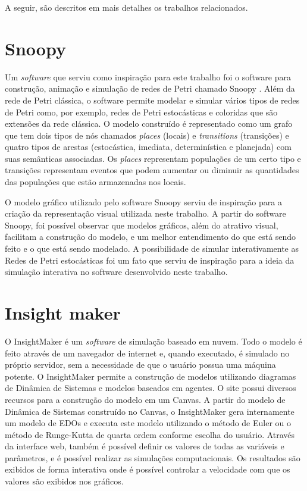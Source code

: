 \documentclass[
	12pt,				%
	openright,			%
	oneside,			%
	a4paper,			%
	main=brazil,
	english,			%
	]{ufsj-abntex2}
\begin{document}
A seguir, são descritos em mais detalhes os trabalhos relacionados. 

\section{Snoopy}

Um \textit{software} que serviu como inspiração para este trabalho foi o software para construção, animação e simulação de redes de Petri chamado Snoopy \cite{Heiner2008,Heiner2012,Liu2012}. Além da rede de Petri clássica, o software permite modelar e simular vários tipos de redes de Petri como, por exemplo, redes de Petri estocásticas e coloridas que são extensões da rede clássica. O modelo construído é representado como um grafo que tem dois tipos de nós chamados \textit{places} (locais) e \textit{transitions} (transições) e quatro tipos de arestas (estocástica, imediata, determinística e planejada) com suas semânticas associadas. Os \textit{places} representam populações de um certo tipo e transições representam eventos que podem aumentar ou diminuir as quantidades das populações que estão armazenadas nos locais. 

O modelo gráfico utilizado pelo software Snoopy serviu de inspiração para a criação da representação visual utilizada neste trabalho. A partir do software Snoopy, foi possível observar que modelos gráficos, além do atrativo visual, facilitam a construção do modelo, e um melhor entendimento do que está sendo feito e o que está sendo modelado. A possibilidade de simular interativamente as Redes de Petri estocásticas foi um fato que serviu de inspiração para a ideia da simulação interativa no software desenvolvido neste trabalho. 

\section{Insight maker}
    
O InsightMaker \cite{insightmaker} é um \textit{software} de simulação baseado em nuvem. Todo o modelo é feito através de um navegador de internet e, quando executado, é simulado no próprio servidor, sem a necessidade de que o usuário possua uma máquina potente. O InsightMaker \cite{insightmaker} permite a construção de modelos utilizando diagramas de Dinâmica de Sistemas e modelos baseados em agentes. O site possui diversos recursos para a construção do modelo em um Canvas. A partir do modelo de Dinâmica de Sistemas construído no Canvas, o InsightMaker \cite{insightmaker} gera internamente um modelo de EDOs e executa este modelo utilizando o método de Euler ou o método de Runge-Kutta de quarta ordem conforme escolha do usuário. Através da interface web, também é possível definir os valores de todas as variáveis e parâmetros, e é possível realizar as simulações computacionais. Os resultados são exibidos de forma interativa onde é possível controlar a velocidade com que os valores são exibidos nos gráficos. 
\end{document}
